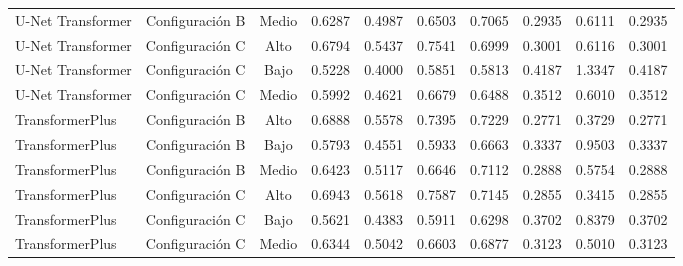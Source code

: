 \begin{table}[H]
\begin{tabular}{lccccccccc}
        U-Net Transformer & Configuración B & Medio & 0.6287 & 0.4987 & 0.6503 & 0.7065 & 0.2935 & 0.6111 & 0.2935 \\
        U-Net Transformer & Configuración C & Alto & 0.6794 & 0.5437 & 0.7541 & 0.6999 & 0.3001 & 0.6116 & 0.3001 \\
        U-Net Transformer & Configuración C & Bajo & 0.5228 & 0.4000 & 0.5851 & 0.5813 & 0.4187 & 1.3347 & 0.4187 \\
        U-Net Transformer & Configuración C & Medio & 0.5992 & 0.4621 & 0.6679 & 0.6488 & 0.3512 & 0.6010 & 0.3512 \\
        TransformerPlus & Configuración B & Alto & 0.6888 & 0.5578 & 0.7395 & 0.7229 & 0.2771 & 0.3729 & 0.2771 \\
        TransformerPlus & Configuración B & Bajo & 0.5793 & 0.4551 & 0.5933 & 0.6663 & 0.3337 & 0.9503 & 0.3337 \\
        TransformerPlus & Configuración B & Medio & 0.6423 & 0.5117 & 0.6646 & 0.7112 & 0.2888 & 0.5754 & 0.2888 \\
        TransformerPlus & Configuración C & Alto & 0.6943 & 0.5618 & 0.7587 & 0.7145 & 0.2855 & 0.3415 & 0.2855 \\
        TransformerPlus & Configuración C & Bajo & 0.5621 & 0.4383 & 0.5911 & 0.6298 & 0.3702 & 0.8379 & 0.3702 \\
        TransformerPlus & Configuración C & Medio & 0.6344 & 0.5042 & 0.6603 & 0.6877 & 0.3123 & 0.5010 & 0.3123 \\
        \bottomrule
    \end{tabular}
\end{table}
